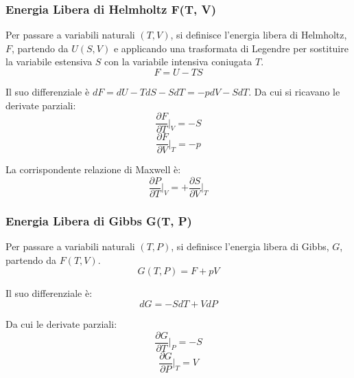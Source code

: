 \subsubsection{Energia Libera di Helmholtz F(T, V)}

Per passare a variabili naturali $(T, V)$, si definisce l'energia libera di Helmholtz, $F$, partendo da $U(S,V)$ e applicando una trasformata di Legendre per sostituire la variabile estensiva $S$ con la variabile intensiva coniugata $T$.
\begin{equation}
    F = U - TS
    \label{eq:def_F_ch3}
\end{equation}

Il suo differenziale è $dF = dU - TdS - SdT = -pdV - SdT$. Da cui si ricavano le derivate parziali:
\begin{equation}
    \frac{\partial F}{\partial T} \bigg|_{V} = -S
    \label{eq:dF_dT}
\end{equation}
\begin{equation}
    \frac{\partial F}{\partial V} \bigg|_{T} = -p
    \label{eq:dF_dV}
\end{equation}

La corrispondente relazione di Maxwell è:
\begin{equation}
    \frac{\partial P}{\partial T}\bigg|_{V}=+\frac{\partial S}{\partial V}\bigg|_{T}
    \label{eq:maxwell_F}
\end{equation}

\subsubsection{Energia Libera di Gibbs G(T, P)}

Per passare a variabili naturali $(T, P)$, si definisce l'energia libera di Gibbs, $G$, partendo da $F(T,V)$.
\begin{equation}
    G(T,P)=F+pV
    \label{eq:def_G}
\end{equation}

Il suo differenziale è:
\begin{equation}
    dG = -SdT+VdP
    \label{eq:dG}
\end{equation}

Da cui le derivate parziali:
\begin{equation}
    \frac{\partial G}{\partial T}\bigg|_{P}=-S
    \label{eq:dG_dT}
\end{equation}
\begin{equation}
    \frac{\partial G}{\partial P}\bigg|_{T}=V
    \label{eq:dG_dP}
\end{equation}

